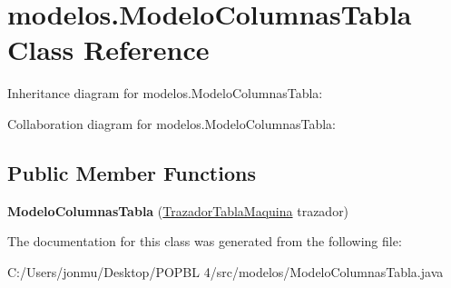 \hypertarget{classmodelos_1_1_modelo_columnas_tabla}{}\section{modelos.\+Modelo\+Columnas\+Tabla Class Reference}
\label{classmodelos_1_1_modelo_columnas_tabla}


Inheritance diagram for modelos.\+Modelo\+Columnas\+Tabla\+:


Collaboration diagram for modelos.\+Modelo\+Columnas\+Tabla\+:
\subsection*{Public Member Functions}
\begin{DoxyCompactItemize}
\item 
\mbox{\label{classmodelos_1_1_modelo_columnas_tabla_a1ac636f1d60b6abb63e86834e6c8f09d}} 
{\bfseries Modelo\+Columnas\+Tabla} (\mbox{\hyperlink{classmodelos_1_1_trazador_tabla_maquina}{Trazador\+Tabla\+Maquina}} trazador)
\end{DoxyCompactItemize}


The documentation for this class was generated from the following file\+:\begin{DoxyCompactItemize}
\item 
C\+:/\+Users/jonmu/\+Desktop/\+P\+O\+P\+B\+L 4/src/modelos/Modelo\+Columnas\+Tabla.\+java\end{DoxyCompactItemize}
